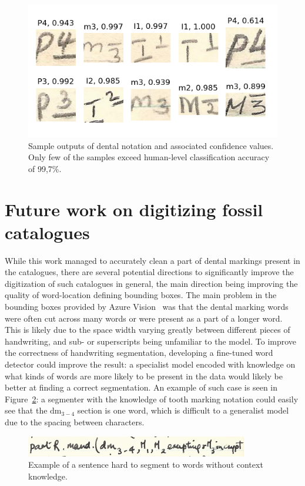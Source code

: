 \documentclass[english,twoside,openright]{UH_DS_MSc}
\begin{document}
\begin{figure}[ht]
    \centering
    \includegraphics*[scale=0.8]{images/inference.png}
    \caption{Sample outputs of dental notation and associated confidence values. Only few of the samples exceed human-level classification accuracy of 99,7\%.}
    \label{image:inference}
\end{figure}

\section{Future work on digitizing fossil catalogues}

While this work managed to accurately clean a part of dental markings present in the catalogues, 
there are several potential directions to significantly improve the digitization of such catalogues in general, the main direction 
being improving the quality of word-location defining bounding boxes. The main problem in the bounding boxes provided 
by Azure Vision~\cite{azurevision} was that the dental marking words were often cut across many words or were present 
as a part of a longer word. This is likely due to the space width varying greatly between different pieces of 
handwriting, and sub- or superscripts being unfamiliar to the model. To improve the correctness of handwriting segmentation, developing a fine-tuned word detector 
could improve the result: a specialist model encoded with knowledge on what kinds of words are more likely to be 
present in the data would likely be better at finding a correct segmentation. An example of 
such case is seen in Figure~\ref{image:hardsentence}: a segmenter with the knowledge of tooth marking notation could 
easily see that the $\text{dm}_{3-4}$ section is one word, which is difficult to a generalist model 
due to the spacing between characters.

\begin{figure}[ht]
    \centering
    \includegraphics*[scale=0.8]{images/hardwordsegmentation.png}
    \caption{Example of a sentence hard to segment to words without context knowledge.}
    \label{image:hardsentence}
\end{figure}
\end{document}
